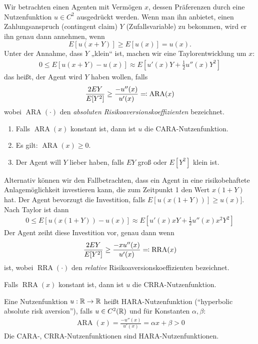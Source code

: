 \documentclass[a4paper,twoside,DIV15,BCOR12mm]{scrbook}
\DeclareMathOperator{\ARA}{ARA}
\DeclareMathOperator{\RRA}{RRA}
\begin{document}
Wir betrachten einen Agenten mit Vermögen $x$, dessen Präferenzen durch eine Nutzenfunktion $u\in C^2$ ausgedrückt werden. Wenn man ihn anbietet, einen Zahlungsanspruch (contingent claim) $Y$ (Zufallsvariable) zu bekommen, wird er ihn genau dann annehmen, wenn \[E[u(x+Y)] \ge E[u(x)] = u(x).\]
Unter der Annahme, dass $Y$ „klein“ ist, machen wir eine Taylorentwicklung um $x$:
\begin{align*}
0\le E[u(x+Y) - u(x)] \approx E[u'(x)Y+ \frac12 u''(x)Y^2]
\end{align*}
das heißt, der Agent wird $Y$ haben wollen, falls 
\begin{align*}
\frac{2EY}{E[Y^2]} \ge \frac{-u''(x)}{u'(x)} \ad \ARA(x)
\end{align*}
wobei $\ARA(\cdot)$ den \emph{absoluten Risikoaversionskoeffizienten} bezeichnet.

\begin{bemerkung}
\begin{enumerate}
\item Falls $\ARA(x)$ konstant ist, dann ist $u$ die CARA-Nutzenfunktion.
\item Es gilt: $\ARA(x) \ge 0$.
\item Der Agent will $Y$ lieber haben, falls $EY$ groß oder $E[Y^2]$ klein ist.
\end{enumerate}
\end{bemerkung}

Alternativ können wir den Fallbetrachten, dass ein Agent in eine risikobehaftete Anlagemöglichkeit investieren kann, die zum Zeitpunkt 1 den Wert $x(1+Y)$ hat. Der Agent bevorzugt die Investition, falls $E[u(x(1+Y))] \ge u(x)]$. Nach Taylor ist dann
\begin{align*}
0 \le E[u(x(1+Y)) - u(x)] \approx E[u'(x)xY + \frac12 u''(x) x^2 Y^2]
\end{align*}
Der Agent zeiht diese Investition vor, genau dann wenn
\[\frac{2EY}{E[Y^2]}\ge \frac {-xu''(x)}{u'(x)} \ad \RRA(x)\]
ist, wobei $\RRA(\cdot)$ den \emph{relative} Risikoaversionskoeffizienten  bezeichnet.

\begin{bemerkung}
Falls $\RRA(x)$ konstant ist, dann ist $u$ die CRRA-Nutzenfunktion.
\end{bemerkung}

\begin{definition}
Eine Nutzenfunktion $u:\mathbb{R}\to\mathbb{R}$ heißt HARA-Nutzenfunktion (“hyperbolic absolute risk aversion”), falls $u\in C^2(\mathbb{R})$ und für Konstanten $\alpha, \beta$:
\begin{align*}
\ARA(x) = \frac{-u''(x)}{u'(x)} = \alpha x + \beta > 0
\end{align*}
Die CARA-, CRRA-Nutzenfunktionen sind HARA-Nutzenfunktionen.
\end{definition}
\end{document}
